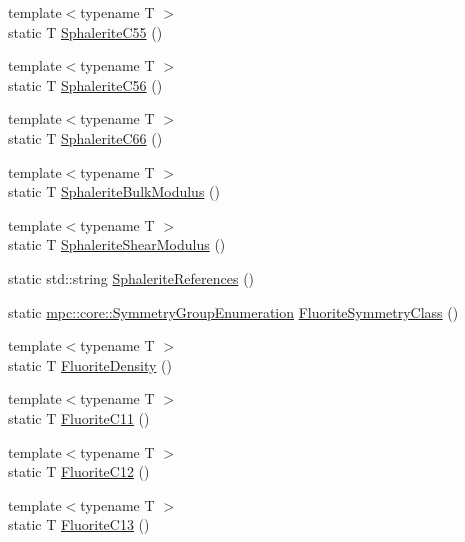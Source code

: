 \begin{DoxyCompactItemize}
\item 
{\footnotesize template$<$typename T $>$ }\\static T \mbox{\hyperlink{namespacempc_1_1data_ace22e6ee016aab76fc5184a359b05a8c}{Sphalerite\+C55}} ()
\item 
{\footnotesize template$<$typename T $>$ }\\static T \mbox{\hyperlink{namespacempc_1_1data_a149e70c81b641a4563565734f1357853}{Sphalerite\+C56}} ()
\item 
{\footnotesize template$<$typename T $>$ }\\static T \mbox{\hyperlink{namespacempc_1_1data_a25daa9935311ad2e177dec08163c2fda}{Sphalerite\+C66}} ()
\item 
{\footnotesize template$<$typename T $>$ }\\static T \mbox{\hyperlink{namespacempc_1_1data_a8674a9a41026ea2946526fcb6a073fbc}{Sphalerite\+Bulk\+Modulus}} ()
\item 
{\footnotesize template$<$typename T $>$ }\\static T \mbox{\hyperlink{namespacempc_1_1data_a89e59f46d585e1438ba6504b945e1171}{Sphalerite\+Shear\+Modulus}} ()
\item 
static std\+::string \mbox{\hyperlink{namespacempc_1_1data_aa37093379d94404e4a43b7b9a1643e95}{Sphalerite\+References}} ()
\item 
static \mbox{\hyperlink{namespacempc_1_1core_a9d979684062547055a0ef5c13077bad8}{mpc\+::core\+::\+Symmetry\+Group\+Enumeration}} \mbox{\hyperlink{namespacempc_1_1data_aa9ee9ca25d7714b2d8407fb7dec10df9}{Fluorite\+Symmetry\+Class}} ()
\item 
{\footnotesize template$<$typename T $>$ }\\static T \mbox{\hyperlink{namespacempc_1_1data_aa6e521c73f6952b9d452233407da9b20}{Fluorite\+Density}} ()
\item 
{\footnotesize template$<$typename T $>$ }\\static T \mbox{\hyperlink{namespacempc_1_1data_ad5d990ae2df77ff3c99ce8f13bea2ae7}{Fluorite\+C11}} ()
\item 
{\footnotesize template$<$typename T $>$ }\\static T \mbox{\hyperlink{namespacempc_1_1data_a86055410ecfaa5bd13fad2d95937be3f}{Fluorite\+C12}} ()
\item 
{\footnotesize template$<$typename T $>$ }\\static T \mbox{\hyperlink{namespacempc_1_1data_a55f258a79775314f42baf957dbc91c14}{Fluorite\+C13}} ()
\item 

\end{DoxyCompactItemize}
